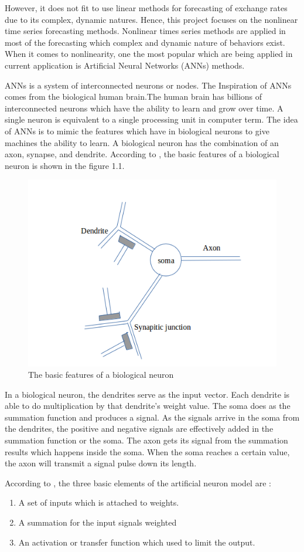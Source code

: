 However, it does not fit to use linear methods for forecasting of exchange rates due to its complex, dynamic natures. Hence, this project focuses on the  nonlinear time series forecasting methods. Nonlinear times series methods are applied in most of the  forecasting which complex and dynamic nature of behaviors exist. When it comes to nonlinearity, one the most popular which are being applied in current application is Artificial Neural Networks (ANNs) methods.

ANNs is  a system of interconnected neurons  or nodes. The Inspiration of ANNs comes from the biological human brain.The human brain has billions of interconnected neurons which have the ability to learn and grow over time. A single neuron is equivalent to a single processing unit  in computer term. The idea of ANNs is  to mimic the features which have  in biological neurons to give  machines the ability to learn. A biological neuron has the combination of an axon, synapse, and dendrite. According to , the basic features of a biological neuron is shown in the figure 1.1.

\begin{figure}[hbt!]\centering
	\includegraphics[width=.6\textwidth]{basic_neuron}
	\caption{The basic features of a biological neuron}
\end{figure}

In a biological neuron, the dendrites  serve as the input vector. Each dendrite is able to do multiplication by that dendrite's weight value. The soma does as the summation function  and produces a signal. As the signals arrive in the soma from the dendrites, the positive and negative signals are effectively added in the summation function or the soma. The axon gets its signal from the summation results which happens inside the soma. When the soma reaches a certain value, the axon will transmit a signal pulse down its length.

According to , the three basic elements of the artificial neuron model are : 
\begin{enumerate}
	\item A set of  inputs which is attached to weights.
	\item A summation  for the input signals weighted
	\item An activation or transfer function which used to  limit  the output.
\end{enumerate}


